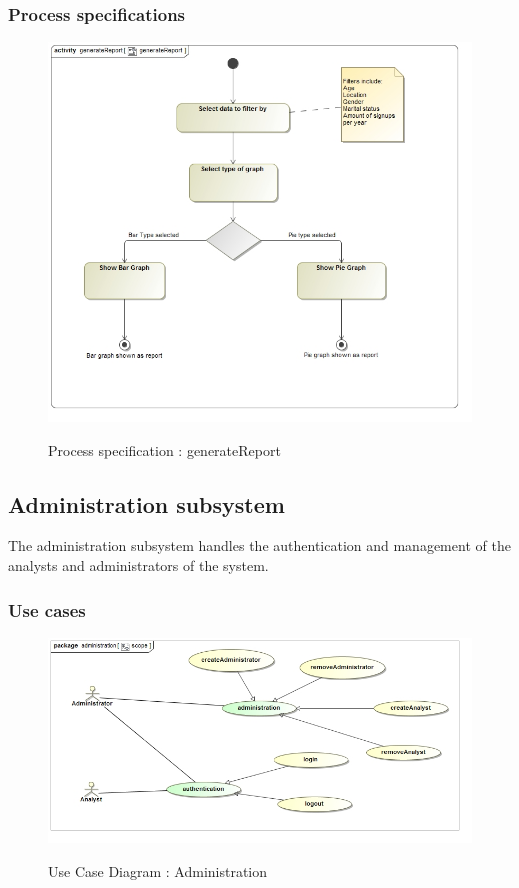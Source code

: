 \documentclass{article}
\begin{document}
		\subsubsection{Process specifications}
		\begin{figure}[H]
		\includegraphics[width=\textwidth]{images/process__generateReport.jpg}  \\
		\caption{Process specification : generateReport}
		\end{figure}
	\pagebreak
	\subsection{Administration subsystem}\label{subsec:Admin}
	The administration subsystem handles the authentication and management of the analysts and administrators of the system.
		\subsubsection{Use cases}
		\begin{figure}[H]
		\includegraphics[width=\textwidth]{images/uc__administration__scope.jpg}  \\
		\caption{Use Case Diagram : Administration}
		\end{figure}
\end{document}
